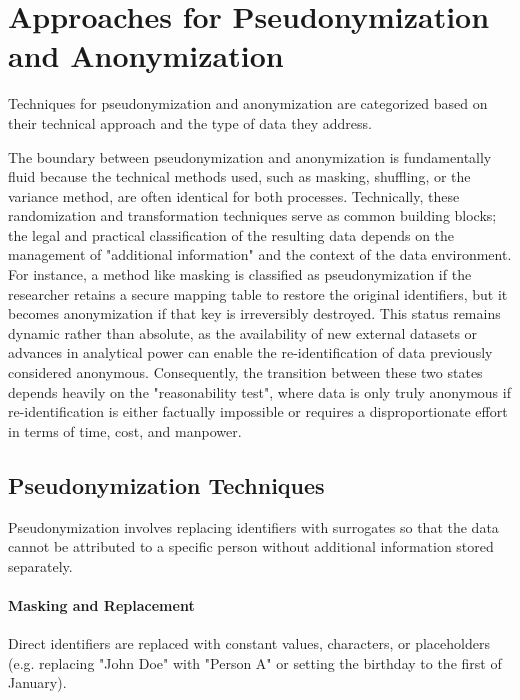 \section{Approaches for Pseudonymization and Anonymization}
\label{sec:approaches}

Techniques for pseudonymization and anonymization are categorized based on their technical approach and the type of data they address.

The boundary between pseudonymization and anonymization is fundamentally fluid because the technical methods used, such as masking, shuffling, or the variance method, are often identical for both processes. Technically, these randomization and transformation techniques serve as common building blocks; the legal and practical classification of the resulting data depends on the management of "additional information" and the context of the data environment. For instance, a method like masking is classified as pseudonymization if the researcher retains a secure mapping table to restore the original identifiers, but it becomes anonymization if that key is irreversibly destroyed. This status remains dynamic rather than absolute, as the availability of new external datasets or advances in analytical power can enable the re-identification of data previously considered anonymous. Consequently, the transition between these two states depends heavily on the "reasonability test", where data is only truly anonymous if re-identification is either factually impossible or requires a disproportionate effort in terms of time, cost, and manpower.
\autocite[3--4]{schwartmann2022praxisleitfaden}
\autocite[44--45, 55, 68, 71]{gmdsbvd2024praxishilfe}
\autocite[77--80]{Krebs2022}


\subsection{Pseudonymization Techniques}
Pseudonymization involves replacing identifiers with surrogates so that the data cannot be attributed to a specific person without additional information stored separately.
\autocite[71, 77]{Krebs2022}

\paragraph{Masking and Replacement}
Direct identifiers are replaced with constant values, characters, or placeholders (e.g. replacing "John Doe" with "Person A" or setting the birthday to the first of January).
\autocite[77-80]{Krebs2022}
\autocite[40, 44]{gmdsbvd2024praxishilfe}

